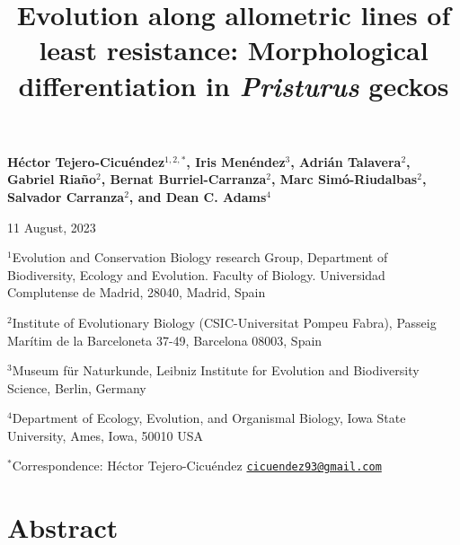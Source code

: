\documentclass[
  11pt,
]{article}
\title{Evolution along allometric lines of least resistance:
Morphological differentiation in \emph{Pristurus} geckos}
\author{}
\date{\vspace{-2.5em}}
\begin{document}
\maketitle

\begin{center}
\textbf{H{\'{e}}ctor Tejero-Cicu{\'{e}}ndez$^{1,2,*}$,  Iris Men{\'{e}}ndez$^{3}$, Adri{\'{a}}n Talavera$^{2}$, Gabriel Riaño$^{2}$, Bernat Burriel-Carranza$^{2}$, Marc Sim{\'{o}}-Riudalbas$^{2}$, Salvador Carranza$^{2}$, and Dean C. Adams$^{4}$}
\end{center}

\begin{center}11 August, 2023\end{center}

\(^{1}\)Evolution and Conservation Biology research Group, Department of
Biodiversity, Ecology and Evolution. Faculty of Biology. Universidad
Complutense de Madrid, 28040, Madrid, Spain

\(^{2}\)Institute of Evolutionary Biology (CSIC-Universitat Pompeu
Fabra), Passeig Marítim de la Barceloneta 37-49, Barcelona 08003, Spain

\(^{3}\)Museum für Naturkunde, Leibniz Institute for Evolution and
Biodiversity Science, Berlin, Germany

\(^{4}\)Department of Ecology, Evolution, and Organismal Biology, Iowa
State University, Ames, Iowa, 50010 USA

\(^{*}\)Correspondence: Héctor Tejero-Cicuéndez
\href{mailto:cicuendez93@gmail.com}{\nolinkurl{cicuendez93@gmail.com}}

\newpage

\hypertarget{abstract}{%
\section{Abstract}\label{abstract}}
\end{document}
